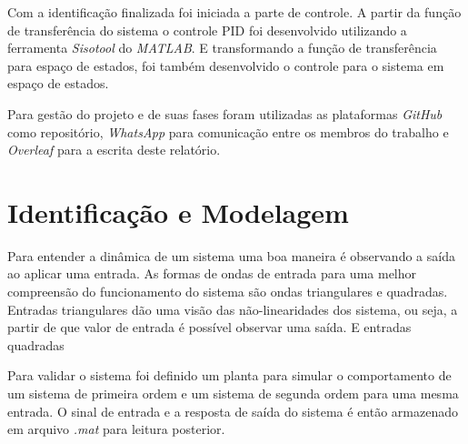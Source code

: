 \documentclass[a4paper,11pt]{article}
\begin{document}
Com a identificação finalizada foi iniciada a parte de controle. A partir da função de transferência do sistema o controle PID foi desenvolvido utilizando a ferramenta \textit{Sisotool} do \textit{MATLAB}. E transformando a função de transferência para espaço de estados, foi também desenvolvido o controle para o sistema em espaço de estados.

Para gestão do projeto e de suas fases foram utilizadas as plataformas \textit{GitHub} como repositório, \textit{WhatsApp} para comunicação entre os membros do trabalho e \textit{Overleaf} para a escrita deste relatório. 



\section{Identificação e Modelagem}


Para entender a dinâmica de um sistema uma boa maneira é observando a saída ao aplicar uma entrada. As formas de ondas de entrada para uma melhor compreensão do funcionamento do sistema são ondas triangulares e quadradas. Entradas triangulares dão uma visão das não-linearidades dos sistema, ou seja, a partir de que valor de entrada é possível observar uma saída. E entradas quadradas 

Para validar o sistema foi definido um planta para simular o comportamento de um sistema de primeira ordem e um sistema de segunda ordem para uma mesma entrada. O sinal de entrada e a resposta de saída do sistema é então armazenado em arquivo \textit{.mat} para leitura posterior.
\end{document}
